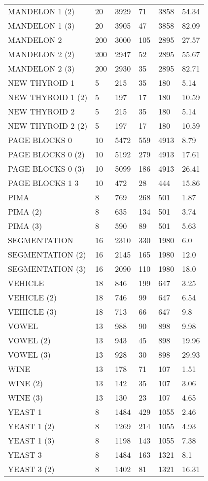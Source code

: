 \documentclass[parskip=full]{scrartcl}
\begin{document}
\begin{table} [H]
\begin{tabular}{ |p{4cm}||p{2.2cm}|p{2.2cm}|p{2.2cm}|p{2.2cm}|p{2.2cm}|  }
MANDELON 1 (2)&	20&	3929&	71&	3858&	54.34\\
MANDELON 1 (3)&	20&	3905&	47&	3858&	82.09\\
MANDELON 2&	200&	3000&	105&	2895&	27.57\\
MANDELON 2 (2)&	200&	2947&	52&	2895&	55.67\\
MANDELON 2 (3)&	200&	2930&	35&	2895&	82.71\\
NEW THYROID 1&	5&	215&	35&	180&	5.14\\
NEW THYROID 1 (2)&	5&	197&	17&	180&	10.59\\
NEW THYROID 2&	5&	215&	35&	180&	5.14\\
NEW THYROID 2 (2)&	5&	197&	17&	180&	10.59\\
PAGE BLOCKS 0&	10&	5472&	559&	4913&	8.79\\
PAGE BLOCKS 0 (2)&	10&	5192&	279&	4913&	17.61\\
PAGE BLOCKS 0 (3)&	10&	5099&	186&	4913&	26.41\\
PAGE BLOCKS 1 3&	10&	472&	28&	444&	15.86\\
PIMA&	8&	769&	268&	501&	1.87\\
PIMA (2)&	8&	635&	134&	501&	3.74\\
PIMA (3)&	8&	590&	89&	501&	5.63\\
SEGMENTATION&	16&	2310&	330&	1980&	6.0\\
SEGMENTATION (2)&	16&	2145&	165&	1980&	12.0\\
SEGMENTATION (3)&	16&	2090&	110&	1980&	18.0\\
VEHICLE&	18&	846&	199&	647&	3.25\\
VEHICLE (2)&	18&	746&	99&	647&	6.54\\
VEHICLE (3)&	18&	713&	66&	647&	9.8\\
VOWEL&	13&	988&	90&	898&	9.98\\
VOWEL (2)&	13&	943&	45&	898&	19.96\\
VOWEL (3)&	13&	928&	30&	898&	29.93\\
WINE&	13&	178&	71&	107&	1.51\\
WINE (2)&	13&	142&	35&	107&	3.06\\
WINE (3)&	13&	130&	23&	107&	4.65\\
YEAST 1&	8&	1484&	429&	1055&	2.46\\
YEAST 1 (2)&	8&	1269&	214&	1055&	4.93\\
YEAST 1 (3)&	8&	1198&	143&	1055&	7.38\\
YEAST 3&	8&	1484&	163&	1321&	8.1\\
YEAST 3 (2)&	8&	1402&	81&	1321&	16.31\\

\end{tabular}
\end{table}
\end{document}
